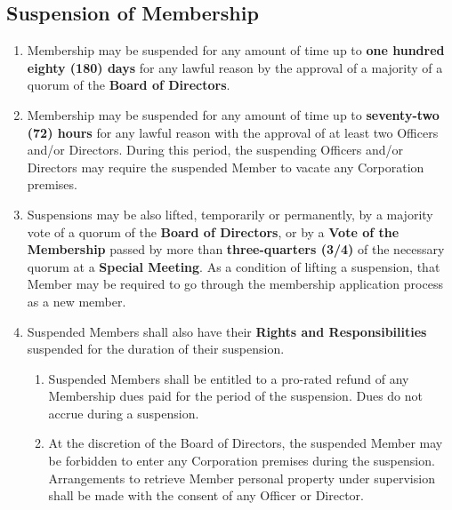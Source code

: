 \documentclass{article}
\begin{document}
\subsection{Suspension of Membership}
\begin{enumerate}
	\item Membership may be suspended for any amount of time up to \textbf{one hundred eighty (180) days} for any lawful reason by the approval of a majority of a quorum of the \textbf{Board of Directors}.
	\item Membership may be suspended for any amount of time up to \textbf{seventy-two (72) hours} for any lawful reason with the approval of at least two Officers and/or Directors.  During this period, the suspending Officers and/or Directors may require the suspended Member to vacate any Corporation premises.
	\item Suspensions may be also lifted, temporarily or permanently, by a majority vote of a quorum of the \textbf{Board of Directors}, or by a \textbf{Vote of the Membership} passed by more than \textbf{three-quarters (3/4)} of the necessary quorum at a \textbf{Special Meeting}.  As a condition of lifting a suspension, that Member may be required to go through the membership application process as a new member.
	\item Suspended Members shall also have their \textbf{Rights and Responsibilities} suspended for the duration of their suspension.
	\begin{enumerate}
		\item Suspended Members shall be entitled to a pro-rated refund of any Membership dues paid for the period of the suspension.  Dues do not accrue during a suspension.
		\item At the discretion of the Board of Directors, the suspended Member may be forbidden to enter any Corporation premises during the suspension.  Arrangements to retrieve Member personal property under supervision shall be made with the consent of any Officer or Director.
	\end{enumerate}
\end{enumerate}
\end{document}
